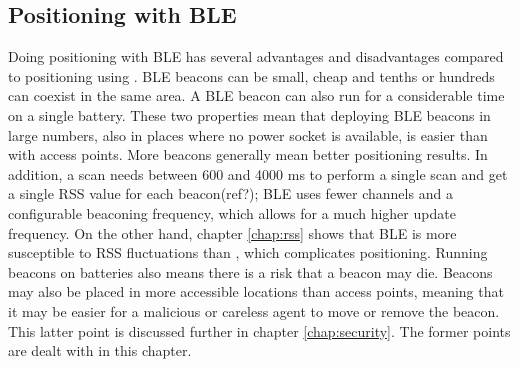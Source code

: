 \subsection{Positioning with BLE}
Doing positioning with BLE has several advantages and disadvantages compared to positioning using \wifi.
BLE beacons can be small, cheap and tenths or hundreds can coexist in the same area.
A BLE beacon can also run for a considerable time on a single battery.
These two properties mean that deploying BLE beacons in large numbers, also in places where no power socket is available, is easier than with \wifi access points.
More beacons generally mean better positioning results.
In addition, a \wifi scan needs between 600 and 4000 ms to perform a single scan and get a single RSS value for each beacon(ref?); BLE uses fewer channels and a configurable beaconing frequency, which allows for a much higher update frequency.
On the other hand, chapter \ref{chap:rss} shows that BLE is more susceptible to RSS fluctuations than \wifi, which complicates positioning.
Running beacons on batteries also means there is a risk that a beacon may die.
Beacons may also be placed in more accessible locations than \wifi access points, meaning that it may be easier for a malicious or careless agent to move or remove the beacon.
This latter point is discussed further in chapter \ref{chap:security}.
The former points are dealt with in this chapter.



